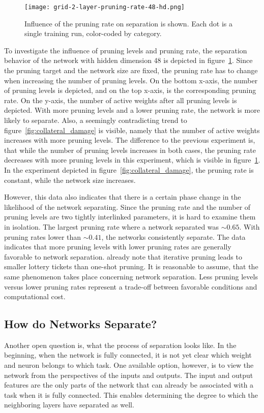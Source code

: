 \begin{figure}[ht] %
    \centering
    \texttt{[image: grid-2-layer-pruning-rate-48-hd.png]}
    \caption[Influence of pruning rate on separation]{
        Influence of the pruning rate on separation is shown.
        Each dot is a single training run, color-coded by category.
    }\label{fig:grid-2}
\end{figure}

To investigate the influence of pruning levels and pruning rate, the separation behavior of the network with hidden dimension 48 is depicted in figure~\ref{fig:grid-2}.
Since the pruning target and the network size are fixed, the pruning rate has to change when increasing the number of pruning levels.
On the bottom x-axis, the number of pruning levels is depicted, and on the top x-axis, is the corresponding pruning rate.
On the y-axis, the number of active weights after all pruning levels is depicted.
With more pruning levels and a lower pruning rate, the network is more likely to separate.
Also, a seemingly contradicting trend to figure~\ref{fig:collateral_damage} is visible, namely that the number of active weights increases with more pruning levels.
The difference to the previous experiment is, that while the number of pruning levels increases in both cases, the pruning rate decreases with more pruning levels in this experiment, which is visible in figure~\ref{fig:grid-2}. In the experiment depicted in figure~\ref{fig:collateral_damage}, the pruning rate is constant, while the network size increases.

However, this data also indicates that there is a certain phase change in the likelihood of the network separating.
Since the pruning rate and the number of pruning levels are two tightly interlinked parameters, it is hard to examine them in isolation.
The largest pruning rate where a network separated was $\sim0.65$. 
With pruning rates lower than $\sim0.41$, the networks consistently separate.
The data indicates that more pruning levels with lower pruning rates are generally favorable to network separation.
\textcite{LTH} already note that iterative pruning leads to smaller lottery tickets than one-shot pruning.
It is reasonable to assume, that the same phenomenon takes place concerning network separation.
Less pruning levels versus lower pruning rates represent a trade-off between favorable conditions and computational cost.

\subsection{How do Networks Separate?}
Another open question is, what the process of separation looks like.
In the beginning, when the network is fully connected, it is not yet clear which weight and neuron belongs to which task.
One available option, however, is to view the network from the perspectives of the inputs and outputs.
The input and output features are the only parts of the network that can already be associated with a task when it is fully connected.
This enables determining the degree to which the neighboring layers have separated as well.

